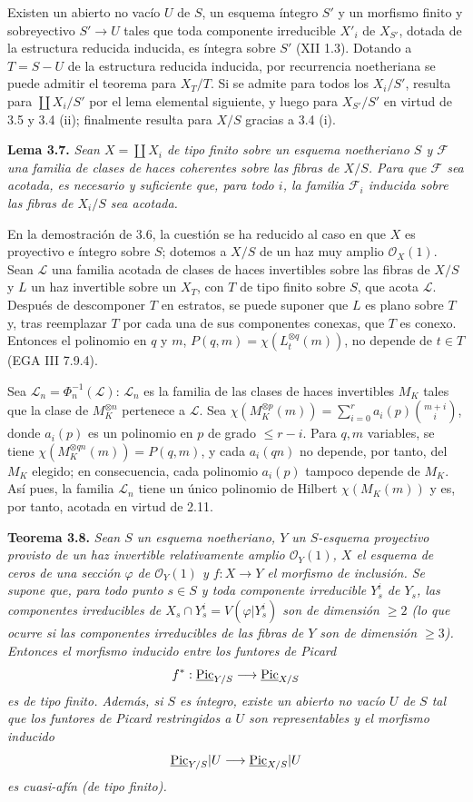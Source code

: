 Existen un abierto no vacío $U$ de $S$, un esquema íntegro $S'$ y un
morfismo finito y sobreyectivo $S'\to U$ tales que toda componente
irreducible $X'_i$ de $X_{S'}$, dotada de la estructura reducida inducida,
es íntegra sobre $S'$ (XII 1.3). Dotando a $T=S-U$ de la estructura reducida
inducida, por recurrencia noetheriana se puede admitir el teorema para
$X_T/T$. Si se admite para todos los $X_i/S'$, resulta para
$\coprod X_i/S'$ por el lema elemental siguiente, y luego para
$X_{S'}/S'$ en virtud de 3.5 y 3.4 (ii); finalmente resulta para $X/S$
gracias a 3.4 (i).

\textbf{Lema 3.7.} \emph{Sean $X=\coprod X_i$ de tipo finito sobre un
esquema noetheriano $S$ y $\mathcal F$ una familia de clases de haces
coherentes sobre las fibras de $X/S$. Para que $\mathcal F$ sea acotada, es
necesario y suficiente que, para todo $i$, la familia $\mathcal F_i$
inducida sobre las fibras de $X_i/S$ sea acotada.}

En la demostración de 3.6, la cuestión se ha reducido al caso en que $X$ es
proyectivo e íntegro sobre $S$; dotemos a $X/S$ de un haz muy amplio
$\mathcal O_X(1)$. Sean $\mathcal L$ una familia acotada de clases de haces
invertibles sobre las fibras de $X/S$ y $L$ un haz invertible sobre un
$X_T$, con $T$ de tipo finito sobre $S$, que acota $\mathcal L$. Después de
descomponer $T$ en estratos, se puede suponer que $L$ es plano sobre $T$ y,
tras reemplazar $T$ por cada una de sus componentes conexas, que $T$ es
conexo. Entonces el polinomio en $q$ y $m$,
$P(q,m)=\chi(L_t^{\otimes q}(m))$, no depende de $t\in T$ (EGA III 7.9.4).

Sea $\mathcal L_n=\Phi_n^{-1}(\mathcal L)$: $\mathcal L_n$ es la familia de
las clases de haces invertibles $M_K$ tales que la clase de
$M_K^{\otimes n}$ pertenece a $\mathcal L$. Sea
$\chi(M_K^{\otimes p}(m))=\sum_{i=0}^{r}a_i(p)\binom{m+i}{i}$, donde
$a_i(p)$ es un polinomio en $p$ de grado $\leq r-i$. Para $q,m$ variables,
se tiene $\chi(M_K^{\otimes qn}(m))=P(q,m)$, y cada $a_i(qn)$ no depende,
por tanto, del $M_K$ elegido; en consecuencia, cada polinomio $a_i(p)$
tampoco depende de $M_K$. Así pues, la familia $\mathcal L_n$ tiene un único
polinomio de Hilbert $\chi(M_K(m))$ y es, por tanto, acotada en virtud de
2.11.

\textbf{Teorema 3.8.} \emph{Sean $S$ un esquema noetheriano, $Y$ un
$S$-esquema proyectivo provisto de un haz invertible relativamente amplio
$\mathcal O_Y(1)$, $X$ el esquema de ceros de una sección $\varphi$ de
$\mathcal O_Y(1)$ y $f:X\to Y$ el morfismo de inclusión. Se supone que, para
todo punto $s\in S$ y toda componente irreducible $Y_s^i$ de $Y_s$, las
componentes irreducibles de
$X_s\cap Y_s^i=V(\varphi|Y_s^i)$ son de dimensión $\geq2$ (lo que ocurre si
las componentes irreducibles de las fibras de $Y$ son de dimensión
$\geq3$). Entonces el morfismo inducido entre los funtores de Picard}
\[
f^*:\underline{\operatorname{Pic}}_{Y/S}\longrightarrow\underline{\operatorname{Pic}}_{X/S}
\]
\emph{es de tipo finito. Además, si $S$ es íntegro, existe un abierto no
vacío $U$ de $S$ tal que los funtores de Picard restringidos a $U$ son
representables y el morfismo inducido}
\[
\underline{\operatorname{Pic}}_{Y/S}|U\longrightarrow\underline{\operatorname{Pic}}_{X/S}|U
\]
\emph{es cuasi-afín (de tipo finito).}

